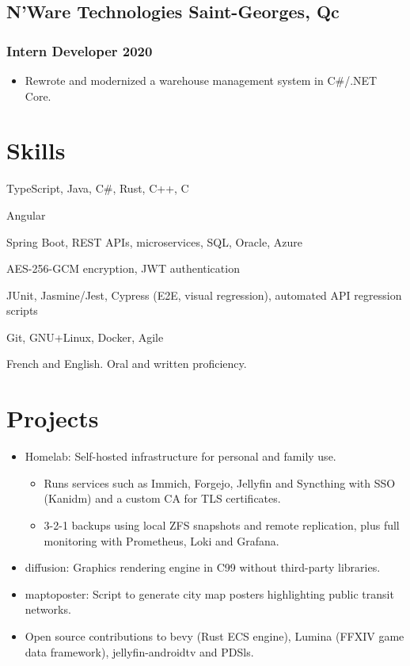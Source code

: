 \documentclass[10pt]{article} %
\begin{document}
\subsection{N'Ware Technologies \hfill Saint-Georges, Qc}
\subsubsection{Intern Developer \hfill 2020}
\begin{itemize}
	\item Rewrote and modernized a warehouse management system in C\#/.NET Core.
\end{itemize}


\section{Skills}
\begin{description}[itemsep=0pt]
	\item[Programming] TypeScript, Java, C\#, Rust, C++, C
	\item[Frontend] Angular
	\item[Backend] Spring Boot, REST APIs, microservices, SQL, Oracle, Azure
	\item[Security] AES-256-GCM encryption, JWT authentication
	\item[Testing] JUnit, Jasmine/Jest, Cypress (E2E, visual regression),
        automated API regression scripts
	\item[Tools \& practices] Git, GNU+Linux, Docker, Agile
	\item[Languages] French and English. Oral and written proficiency.
\end{description}


\section{Projects}
\begin{itemize}
	\item Homelab: Self-hosted infrastructure for personal and family use.
        \begin{itemize}
            \item Runs services such as Immich, Forgejo, Jellyfin and Syncthing
            with SSO (Kanidm) and a custom CA for TLS certificates.
            \item 3-2-1 backups using local ZFS snapshots and remote
            replication, plus full monitoring with Prometheus, Loki and Grafana.
        \end{itemize}
	\item diffusion: Graphics rendering engine in C99 without third-party
        libraries.
	\item maptoposter: Script to generate city map posters highlighting
		public transit networks.
	\item Open source contributions to bevy (Rust ECS engine), Lumina (FFXIV
        game data framework), \mbox{jellyfin-androidtv} and PDSls.
\end{itemize}
\end{document}
